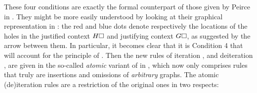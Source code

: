 These four conditions are exactly the formal counterpart of those given by
Peirce in \cite{peirce_prolegomena_1906}. They might be more easily understood
by looking at their graphical representation in :
the red and blue dots denote respectively the locations of the holes in the
justified context $H\square$ and justifying context $G\square$, as suggested by the
arrow between them. In particular, it becomes clear that it is Condition 4 that
will account for the principle of . Then the new rules of
iteration ,  and deiteration ,
 are given in the so-called \emph{atomic} variant  of
 in , which now only comprises rules that
truly are insertions and omissions of \emph{arbitrary} graphs. The atomic (de)iteration rules are a restriction of the
original ones in two respects:
